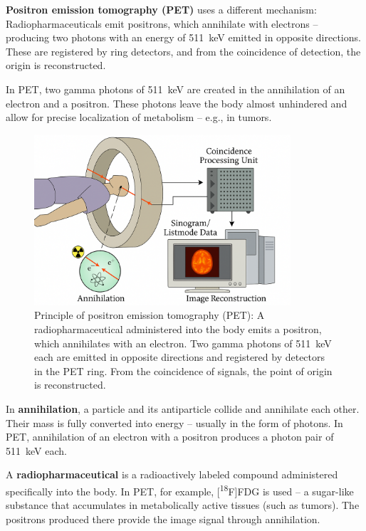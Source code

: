 \textbf{Positron emission tomography (PET)} uses a different mechanism: Radiopharmaceuticals emit positrons, which annihilate with electrons – producing two photons with an energy of \SI{511}{keV} emitted in opposite directions. These are registered by ring detectors, and from the coincidence of detection, the origin is reconstructed.
\vspace{1em}
\begin{tcolorbox}[physikbox, title=Photons in PET]
	\label{box:PET}
	\small
	In PET, two gamma photons of \SI{511}{keV} are created in the annihilation of an electron and a positron. These photons leave the body almost unhindered and allow for precise localization of metabolism – e.g., in tumors.
\end{tcolorbox}
\begin{figure}[H]
	\centering
	\includegraphics[width=0.85\textwidth]{bilder/petscan.png}
	\caption{Principle of positron emission tomography (PET): A radiopharmaceutical administered into the body emits a positron, which annihilates with an electron. Two gamma photons of \SI{511}{keV} each are emitted in opposite directions and registered by detectors in the PET ring. From the coincidence of signals, the point of origin is reconstructed.}
	\label{fig:pet_prinzip}
\end{figure}
\begin{tcolorbox}[didaktikbox, title=Concept: Annihilation]
	\label{box:annihilation}
	\small
	In \textbf{annihilation}, a particle and its antiparticle collide and annihilate each other. Their mass is fully converted into energy – usually in the form of photons. In PET, annihilation of an electron with a positron produces a photon pair of \SI{511}{keV} each.
\end{tcolorbox}
\vspace{1em}
\begin{tcolorbox}[didaktikbox, title=Concept: Radiopharmaceutical]
	\label{box:radiopharmakon}
	\small
	A \textbf{radiopharmaceutical} is a radioactively labeled compound administered specifically into the body. In PET, for example, [\textsuperscript{18}F]FDG is used – a sugar-like substance that accumulates in metabolically active tissues (such as tumors). The positrons produced there provide the image signal through annihilation.
\end{tcolorbox}

